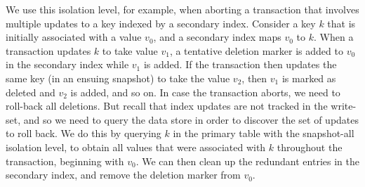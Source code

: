We use this isolation level, for example, when aborting a transaction that 
involves multiple updates to a key indexed by a secondary index. 
Consider a key $k$ that is initially associated with a value $v_0$, 
and a secondary index maps $v_0$ to $k$. 
When a transaction updates $k$ to take value $v_1$, a tentative deletion marker
is added to $v_0$ in the secondary index while $v_1$ is added. 
If the transaction then updates 
the same key (in an ensuing snapshot) to take the value $v_2$, 
then $v_1$ is marked as deleted and $v_2$ is added, and so on. 
In case the transaction aborts, we need to roll-back all deletions. 
But recall that index updates are not tracked in the write-set,
and so we need to query the data store in order to discover the set
of updates to roll back. We do this by querying $k$ in the primary table
with the snapshot-all isolation level, to obtain all values 
that were associated with $k$ throughout the transaction, beginning with $v_0$.
We can then clean up the redundant entries in the secondary index, and 
remove the deletion marker from $v_0$.
 
